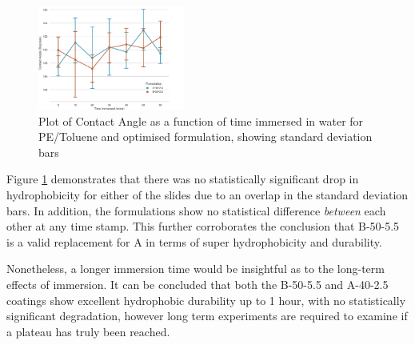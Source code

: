 \begin{figure}[h!]
\centering
  \includegraphics[width=0.43\textwidth]{Sections/Figures/Immersion3.png}
  \caption{Plot of Contact Angle as a function of time immersed in water for PE/Toluene and optimised formulation, showing standard deviation bars}\label{Immersion}
\end{figure} 
Figure \ref{Immersion} demonstrates that there was no statistically significant drop in hydrophobicity for either of the slides due to an overlap in the standard deviation bars. In addition, the formulations show no statistical difference \emph{between} each other at any time stamp. This further corroborates the conclusion that B-50-5.5 is a valid replacement for A in terms of super hydrophobicity and durability. 
\\ 
\par Nonetheless, a longer immersion time would be insightful as to the long-term effects of immersion. It can be concluded that both the B-50-5.5 and A-40-2.5 coatings show excellent hydrophobic durability up to 1 hour, with no statistically significant degradation,  however long term experiments are required to examine if a plateau has truly been reached. 

